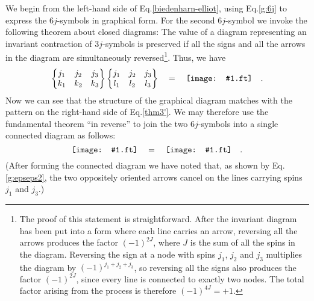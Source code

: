 \documentclass[graybox, secnum]{svmult}
\makeatletter
\newcommand{\ft}{pdf}        %
\newcommand{\makeSymbol}[1]{\mathord{\vcenter{\hbox{#1}}}}
\newcommand{\Symbol}[1]{\makeSymbol{\texttt{[image: \#1.\\ft]}}}
\newcommand{\Eq}[1]{Eq.\@\xspace\eqref{#1}}
\newcommand{\sixj}[6]{\begin{Bmatrix} #1&#2&#3 \\ #4&#5&#6 \end{Bmatrix}}
\makeatother
\begin{document}
We begin from the left-hand side of \Eq{biedenharn-elliot}, using \Eq{g:6j} to express the $6j$-symbols in graphical form. For the second $6j$-symbol we invoke the following theorem about closed diagrams: The value of a diagram representing an invariant contraction of $3j$-symbols is preserved if all the signs and all the arrows in the diagram are simultaneously reversed\footnote{The proof of this statement is straightforward. After the invariant diagram has been put into a form where each line carries an arrow, reversing all the arrows produces the factor $(-1)^{2J}$, where $J$ is the sum of all the spins in the diagram. Reversing the sign at a node with spins $j_1$, $j_2$ and $j_3$ multiplies the diagram by $(-1)^{j_1+j_2+j_3}$, so reversing all the signs also produces the factor $(-1)^{2J}$, since every line is connected to exactly two nodes. The total factor arising from the process is therefore $(-1)^{4J} = +1$.}. Thus, we have
\begin{equation}
	\sixj{j_1}{j_2}{j_3}{k_1}{k_2}{k_3}\sixj{j_1}{j_2}{j_3}{l_1}{l_2}{l_3} \quad = \quad \Symbol{6j6j} \quad . 
	\label{BE-lhs}
\end{equation}
Now we can see that the structure of the graphical diagram matches with the pattern on the right-hand side of \Eq{thm3'}. We may therefore use the fundamental theorem ``in reverse'' to join the two $6j$-symbols into a single connected diagram as follows:
\begin{equation}
	\Symbol{6j6j} \quad = \quad \Symbol{6j6j_connected} \quad . 
	\label{BE-cut}
\end{equation}
(After forming the connected diagram we have noted that, as shown by \Eq{g:epseps2}, the two oppositely oriented arrows cancel on the lines carrying spins $j_1$ and $j_3$.)
\end{document}
